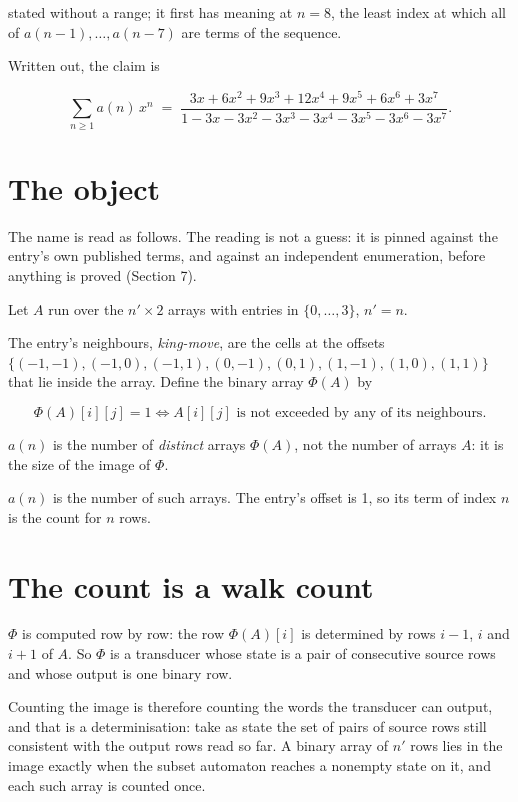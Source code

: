\documentclass[11pt]{article}
\theoremstyle{definition}
\begin{document}
stated without a range; it first has meaning at $n = 8$, the least index at which all of $a(n-1),\dots,a(n-7)$ are terms of the sequence.

Written out, the claim is

\[\sum_{n \ge 1} a(n)\,x^n \;=\; \frac{3x + 6x^{2} + 9x^{3} + 12x^{4} + 9x^{5} + 6x^{6} + 3x^{7}}{1 - 3x - 3x^{2} - 3x^{3} - 3x^{4} - 3x^{5} - 3x^{6} - 3x^{7}}.\]

\section{The object}

The name is read as follows. The reading is not a guess: it is pinned against the entry's own published terms, and against an independent enumeration, before anything is proved (Section 7).

Let $A$ run over the $n' \times 2$ arrays with entries in $\{0,\dots,3\}$, $n' = n$.

The entry's neighbours, {\itshape king-move}, are the cells at the offsets $\{(-1,-1), (-1,0), (-1,1), (0,-1), (0,1), (1,-1), (1,0), (1,1)\}$ that lie inside the array. Define the binary array $\Phi(A)$ by

\[\Phi(A)[i][j] = 1 \iff A[i][j] \text{ is not exceeded by any of its neighbours}.\]

$a(n)$ is the number of {\itshape distinct} arrays $\Phi(A)$, not the number of arrays $A$: it is the size of the image of $\Phi$.

$a(n)$ is the number of such arrays. The entry's offset is 1, so its term of index $n$ is the count for $n$ rows.

\section{The count is a walk count}

$\Phi$ is computed row by row: the row $\Phi(A)[i]$ is determined by rows $i-1$, $i$ and $i+1$ of $A$. So $\Phi$ is a transducer whose state is a pair of consecutive source rows and whose output is one binary row.

Counting the image is therefore counting the words the transducer can output, and that is a determinisation: take as state the set of pairs of source rows still consistent with the output rows read so far. A binary array of $n'$ rows lies in the image exactly when the subset automaton reaches a nonempty state on it, and each such array is counted once.
\end{document}
